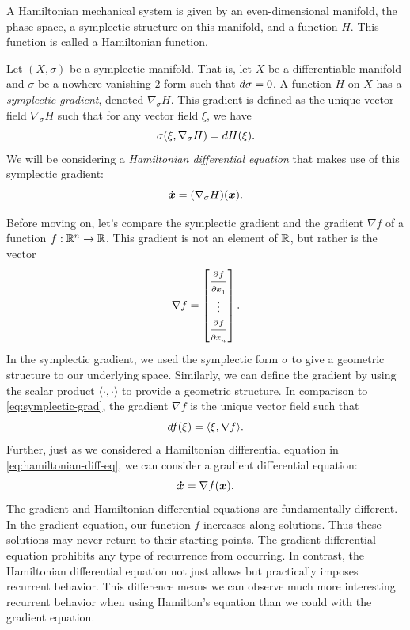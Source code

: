 \documentclass[twoside,letterpaper,10pt]{article}
\newcommand{\sgrad}{\nabla_{\sigma}}
\numberwithin{equation}{section}
\begin{document}
A Hamiltonian mechanical system is given by an even-dimensional manifold, the
phase space, a symplectic structure on this manifold, and a function $H$.
This function is called a Hamiltonian function.

Let $(X, \sigma)$ be a symplectic manifold.
That is, let $X$ be a differentiable manifold and $\sigma$ be a nowhere
vanishing $2$-form such that $\mathop{}\!d \sigma = 0$.
A function $H$ on $X$ has a \emph{symplectic gradient}, denoted $\sgrad H$.
This gradient is defined as the unique vector field $\sgrad H$ such that for any
vector field $\xi$, we have
\begin{equation}
  \label{eq:symplectic-grad}
  \sigma(\xi, \sgrad H) = \dif H(\xi).
\end{equation}
We will be considering a \emph{Hamiltonian differential equation} that makes use
of this symplectic gradient:
\begin{equation}
  \label{eq:hamiltonian-diff-eq}
  \bd{x} = (\sgrad H) (\bp{x}).
\end{equation}

Before moving on, let's compare the symplectic gradient and the gradient $\nabla
f$ of a function $f : \mathbb{R}^n \to \mathbb{R}$.
This gradient is not an element of $\mathbb{R}$, but rather is the vector
\begin{equation*}
  \nabla f =
  \begin{bmatrix}
    \frac{\strut\partial^{}f}{\strut\partial x_1^{}}\\
    \vdots\\
    \frac{\strut\partial^{}f}{\strut\partial x_n^{}}
  \end{bmatrix}.
\end{equation*}
In the symplectic gradient, we used the symplectic form $\sigma$ to give a
geometric structure to our underlying space.
Similarly, we can define the gradient by using the scalar product $\langle
\cdot, \cdot \rangle$ to provide a geometric structure.
In comparison to \cref{eq:symplectic-grad}, the gradient $\nabla f$ is the
unique vector field such that
\begin{equation*}
  \mathop{}\!d f(\xi) = \langle \xi, \nabla f \rangle.
\end{equation*}
Further, just as we considered a Hamiltonian differential equation in
\cref{eq:hamiltonian-diff-eq}, we can consider a gradient differential equation:
\begin{equation*}
  \bm{\dot{x}} = \nabla f(\bm{x}).
\end{equation*}
The gradient and Hamiltonian differential equations are fundamentally different.
In the gradient equation, our function $f$ increases along solutions.
Thus these solutions may never return to their starting points.
The gradient differential equation prohibits any type of recurrence from
occurring.
In contrast, the Hamiltonian differential equation not just allows but
practically imposes recurrent behavior.
This difference means we can observe much more interesting recurrent behavior
when using Hamilton's equation than we could with the gradient equation.
\end{document}
